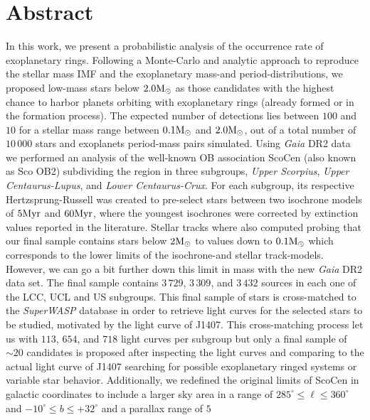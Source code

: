 \begingroup
\let\clearpage\relax
\let\cleardoublepage\relax
\let\cleardoublepage\relax

\chapter*{Abstract}


\vfill
In this work, we present a probabilistic analysis of the occurrence rate of exoplanetary rings. Following a Monte-Carlo and analytic approach to reproduce the stellar mass IMF and the exoplanetary mass-and period-distributions, we proposed low-mass stars below $2.0 \textnormal{M}_\odot$ as those candidates with the highest chance to harbor planets orbiting with exoplanetary rings (already formed or in the formation process). The expected number of detections lies between $100$ and $10$ for a stellar mass range between $0.1 \textnormal{M}_\odot$ and $2.0 \textnormal{M}_\odot$, out of a total number of $10\,000$ stars and exoplanets period-mass pairs simulated. Using \textcolor{halfgray}{\textit{Gaia} DR2} data we performed an analysis of the well-known OB association ScoCen (also known as Sco OB2) subdividing the region in three subgroups, \textcolor{halfgray}{\textit{Upper Scorpius}}, \textcolor{halfgray}{\textit{Upper Centaurus-Lupus}}, and \textcolor{halfgray}{\textit{Lower Centaurus-Crux}}. For each subgroup, its respective Hertzsprung-Russell was created to pre-select stars between two isochrone models of $5 \textnormal{Myr}$ and $60 \textnormal{Myr}$, where the youngest isochrones were corrected by extinction values reported in the literature. Stellar tracks where also computed probing that our final sample contains stars below $2 \textnormal{M}_\odot$ to values down to $0.1 \textnormal{M}_\odot$ which corresponds to the lower limits of the isochrone-and stellar track-models. However, we can go a bit further down this limit in mass with the new \textcolor{halfgray}{\textit{Gaia} DR2} data set. The final sample contains $3\,729$, $3\,309$, and $3\,432$ sources in each one of the \textcolor{halfgray}{LCC}, \textcolor{halfgray}{UCL} and \textcolor{halfgray}{US} subgroups. This final sample of stars is cross-matched to the \textcolor{halfgray}{\textit{SuperWASP}} database in order to retrieve light curves for the selected stars to be studied, motivated by the light curve of J1407. This cross-matching process let us with $113$, $654$, and $718$ light curves per subgroup but only a final sample of $\sim20$ candidates is proposed after inspecting the light curves and comparing to the actual light curve of J1407 searching for possible exoplanetary ringed systems or variable star behavior. Additionally, we redefined the original limits of ScoCen in galactic coordinates to include a larger sky area in a range of $285^\circ\leq\ell\leq360^\circ$ and $-10^\circ\leq b\leq+32^\circ$ and a parallax range of $5$ 